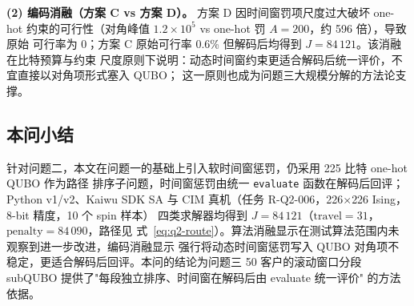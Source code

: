 \documentclass[UTF8,12pt,a4paper]{ctexart}
\begin{document}
\textbf{(2) 编码消融（方案 C vs 方案 D）。} 方案 D 因时间窗罚项尺度过大破坏 one-hot
约束的可行性（对角峰值 $1.2\times 10^{5}$ vs one-hot 罚 $A=200$，约 596 倍），导致原始
可行率为 0；方案 C 原始可行率 0.6\% 但解码后均得到 $J=84\,121$。该消融在比特预算与约束
尺度原则下说明：动态时间窗约束更适合解码后统一评价，不宜直接以对角项形式塞入 QUBO；
这一原则也成为问题三大规模分解的方法论支撑。

\subsection{本问小结}

针对问题二，本文在问题一的基础上引入软时间窗惩罚，仍采用 225 比特 one-hot QUBO 作为路径
排序子问题，时间窗惩罚由统一 \texttt{evaluate} 函数在解码后回评；Python v1/v2、Kaiwu
SDK SA 与 CIM 真机（任务 R-Q2-006，226$\times$226 Ising，8-bit 精度，10 个 spin 样本）
四类求解器均得到 $J=84\,121$（$\mathrm{travel}=31$，$\mathrm{penalty}=84\,090$，路径见
式~\eqref{eq:q2-route}）。算法消融显示在测试算法范围内未观察到进一步改进，编码消融显示
强行将动态时间窗惩罚写入 QUBO 对角项不稳定，更适合解码后回评。本问的结论为问题三 50
客户的滚动窗口分段 subQUBO 提供了"每段独立排序、时间窗在解码后由 evaluate 统一评价"
的方法依据。
\end{document}
